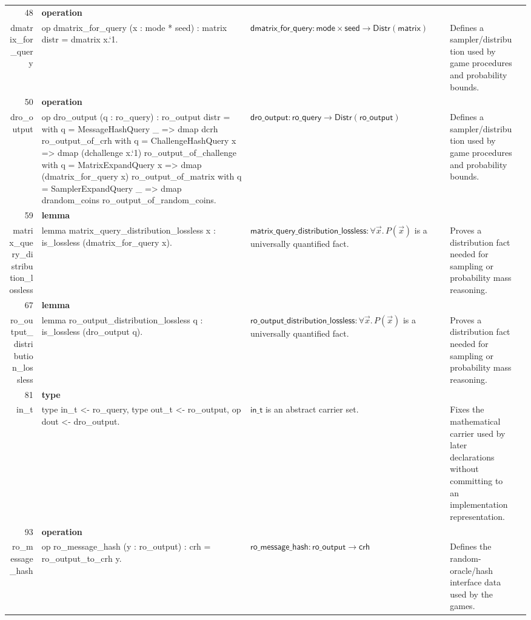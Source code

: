 \documentclass[10pt]{article}
\newcommand{\ec}[1]{\begingroup\ttfamily\scriptsize #1\endgroup}
\begin{document}
\begin{longtable}{r L{0.17\textwidth} L{0.26\textwidth} L{0.27\textwidth} L{0.20\textwidth}}
48 & \textbf{operation}\\\ec{dmatrix\_for\_query} & \ec{op dmatrix\_for\_query (x : mode * seed) : matrix distr = dmatrix x.`1.} & \(\mathsf{dmatrix\_for\_query} : \mathsf{mode} \times \mathsf{seed} \to \mathsf{Distr}(\mathsf{matrix})\) & Defines a sampler/distribution used by game procedures and probability bounds. \\
50 & \textbf{operation}\\\ec{dro\_output} & \ec{op dro\_output (q : ro\_query) : ro\_output distr = with q = MessageHashQuery \_ => dmap dcrh ro\_output\_of\_crh with q = ChallengeHashQuery x => dmap (dchallenge x.`1) ro\_output\_of\_challenge with q = MatrixExpandQuery x => dmap (dmatrix\_for\_query x) ro\_output\_of\_matrix with q = SamplerExpandQuery \_ => dmap drandom\_coins ro\_output\_of\_random\_coins.} & \(\mathsf{dro\_output} : \mathsf{ro\_query} \to \mathsf{Distr}(\mathsf{ro\_output})\) & Defines a sampler/distribution used by game procedures and probability bounds. \\
59 & \textbf{lemma}\\\ec{matrix\_query\_distribution\_lossless} & \ec{lemma matrix\_query\_distribution\_lossless x : is\_lossless (dmatrix\_for\_query x).} & \(\mathsf{matrix\_query\_distribution\_lossless} : \forall \vec{x}.\, P(\vec{x})\) is a universally quantified fact. & Proves a distribution fact needed for sampling or probability mass reasoning. \\
67 & \textbf{lemma}\\\ec{ro\_output\_distribution\_lossless} & \ec{lemma ro\_output\_distribution\_lossless q : is\_lossless (dro\_output q).} & \(\mathsf{ro\_output\_distribution\_lossless} : \forall \vec{x}.\, P(\vec{x})\) is a universally quantified fact. & Proves a distribution fact needed for sampling or probability mass reasoning. \\
81 & \textbf{type}\\\ec{in\_t} & \ec{type in\_t <- ro\_query, type out\_t <- ro\_output, op dout <- dro\_output.} & \(\mathsf{in\_t}\) is an abstract carrier set. & Fixes the mathematical carrier used by later declarations without committing to an implementation representation. \\
93 & \textbf{operation}\\\ec{ro\_message\_hash} & \ec{op ro\_message\_hash (y : ro\_output) : crh = ro\_output\_to\_crh y.} & \(\mathsf{ro\_message\_hash} : \mathsf{ro\_output} \to \mathsf{crh}\) & Defines the random-oracle/hash interface data used by the games. \\

\end{longtable}
\end{document}
